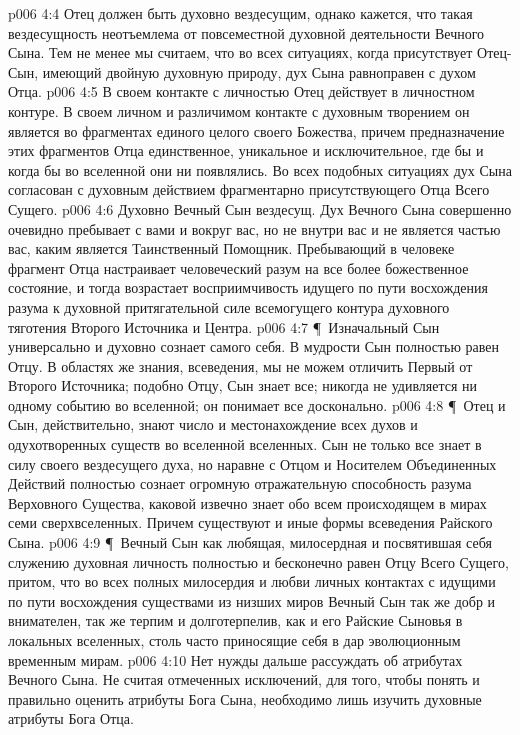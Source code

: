 \vs p006 4:4 Отец должен быть духовно вездесущим, однако кажется, что такая вездесущность неотъемлема от повсеместной духовной деятельности Вечного Сына. Тем не менее мы считаем, что во всех ситуациях, когда присутствует Отец\hyp{}Сын, имеющий двойную духовную природу, дух Сына равноправен с духом Отца.
\vs p006 4:5 В своем контакте с личностью Отец действует в личностном контуре. В своем личном и различимом контакте с духовным творением он является во фрагментах единого целого своего Божества, причем предназначение этих фрагментов Отца единственное, уникальное и исключительное, где бы и когда бы во вселенной они ни появлялись. Во всех подобных ситуациях дух Сына согласован с духовным действием фрагментарно присутствующего Отца Всего Сущего.
\vs p006 4:6 Духовно Вечный Сын вездесущ. Дух Вечного Сына совершенно очевидно пребывает с вами и вокруг вас, но не внутри вас и не является частью вас, каким является Таинственный Помощник. Пребывающий в человеке фрагмент Отца настраивает человеческий разум на все более божественное состояние, и тогда возрастает восприимчивость идущего по пути восхождения разума к духовной притягательной силе всемогущего контура духовного тяготения Второго Источника и Центра.
\vs p006 4:7 \P\ Изначальный Сын универсально и духовно сознает самого себя. В мудрости Сын полностью равен Отцу. В областях же знания, всеведения, мы не можем отличить Первый от Второго Источника; подобно Отцу, Сын знает все; никогда не удивляется ни одному событию во вселенной; он понимает все досконально.
\vs p006 4:8 \P\ Отец и Сын, действительно, знают число и местонахождение всех духов и одухотворенных существ во вселенной вселенных. Сын не только все знает в силу своего вездесущего духа, но наравне с Отцом и Носителем Объединенных Действий полностью сознает огромную отражательную способность разума Верховного Существа, каковой извечно знает обо всем происходящем в мирах семи сверхвселенных. Причем существуют и иные формы всеведения Райского Сына.
\vs p006 4:9 \P\ Вечный Сын как любящая, милосердная и посвятившая себя служению духовная личность полностью и бесконечно равен Отцу Всего Сущего, притом, что во всех полных милосердия и любви личных контактах с идущими по пути восхождения существами из низших миров Вечный Сын так же добр и внимателен, так же терпим и долготерпелив, как и его Райские Сыновья в локальных вселенных, столь часто приносящие себя в дар эволюционным временным мирам.
\vs p006 4:10 Нет нужды дальше рассуждать об атрибутах Вечного Сына. Не считая отмеченных исключений, для того, чтобы понять и правильно оценить атрибуты Бога Сына, необходимо лишь изучить духовные атрибуты Бога Отца.
